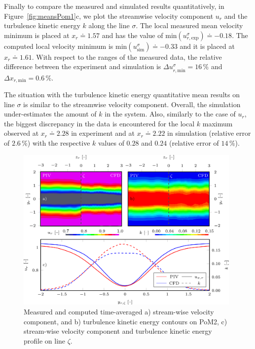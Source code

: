 Finally to compare {the} measured and simulated results quantitatively, {in Figure~\ref{fig:meansPom1}c,} we plot the streamwise velocity component $u_r$ and the turbulence kinetic energy $k$ along the line $\sigma$. The local measured mean velocity minimum is placed at $x_r\doteq 1.57$ and has the value of $\mathrm{min}(u_{r,\mathrm{exp}}^{\sigma})\doteq -0.18$. The computed local velocity minimum is $\mathrm{min}(u_{\mathrm{sim}}^{\sigma})\doteq -0.33$ and it is placed at $x_r\doteq 1.61$. With respect to the ranges of the measured data, the relative difference between the experiment and simulation is $\Delta u_{r,\mathrm{min}}^{\sigma} = 16\,\%$ and $\Delta x_{r,\mathrm{min}} = 0.6\,\%$. %

The situation with the turbulence kinetic energy {quantitative} mean results on line $\sigma$ is similar to the streamwise velocity component. Overall, the simulation under-estimates the amount of $k$ in the system. %
Also, similarly to the case of $u_{{r}}$, the biggest discrepancy in the data is encountered for the local $k$ maximum observed at $x_r\doteq 2.28$ in experiment and at $x_r\doteq 2.22$ in simulation (relative error of $2.6\,\%$) with the respective $k$ values of $0.28$ and $0.24$ (relative error of $14\,\%$).

\begin{figure}[htbp]
    \includegraphics[width=0.98\textwidth]{02_images/00_export/figure6.png}
    \caption{Measured and computed time-averaged a) stream-wise velocity component, and b) turbulence kinetic energy contours on PoM2, c) stream-wise velocity component and turbulence kinetic energy profile on line $\zeta$.}
    \label{fig:meansPom2}
\end{figure}

